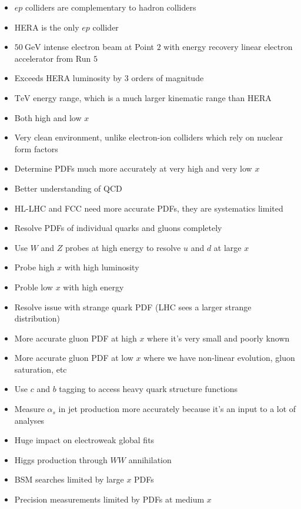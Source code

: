 \documentclass[12pt, a4paper, notitlepage, onecolumn]{article}
\begin{document}
\begin{itemize}
  \item{$ep$ colliders are complementary to hadron colliders}
  \item{HERA is the only $ep$ collider}
  \item{$\SI{50}{\giga\eV}$ intense electron beam at Point $2$ with energy recovery linear electron accelerator from Run $5$}
  \item{Exceeds HERA luminosity by $3$ orders of magnitude}
  \item{$\si{\tera\eV}$ energy range, which is a much larger kinematic range than HERA}
  \item{Both high and low $x$}
  \item{Very clean environment, unlike electron-ion colliders which rely on nuclear form factors}
  \item{Determine PDFs much more accurately at very high and very low $x$}
  \item{Better understanding of QCD}
  \item{HL-LHC and FCC need more accurate PDFs, they are systematics limited}
  \item{Resolve PDFs of individual quarks and gluons completely}
  \item{Use $W$ and $Z$ probes at high energy to resolve $u$ and $d$ at large $x$}
  \item{Probe high $x$ with high luminosity}
  \item{Proble low $x$ with high energy}
  \item{Resolve issue with strange quark PDF (LHC sees a larger strange distribution)}
  \item{More accurate gluon PDF at high $x$ where it's very small and poorly known}
  \item{More accurate gluon PDF at low $x$ where we have non-linear evolution, gluon saturation, etc}
  \item{Use $c$ and $b$ tagging to access heavy quark structure functions}
  \item{Measure $\alpha_s$ in jet production more accurately because it's an input to a lot of analyses}
  \item{Huge impact on electroweak global fits}
  \item{Higgs production through $WW$ annihilation}
  \item{BSM searches limited by large $x$ PDFs}
  \item{Precision measurements limited by PDFs at medium $x$}
\end{itemize}
\end{document}
